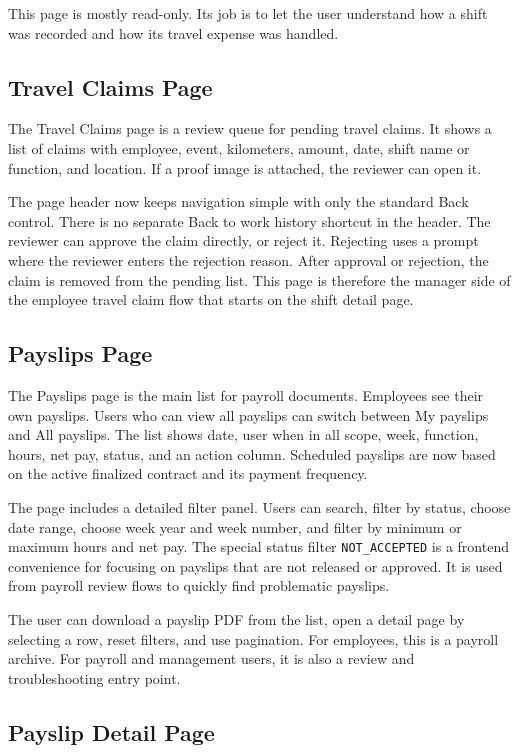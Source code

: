 \documentclass[11pt]{article}
\newcommand{\code}[1]{\nolinkurl{#1}}
\begin{document}
This page is mostly read-only. Its job is to let the user understand how a shift was recorded and how its travel expense was handled.

\subsection{Travel Claims Page}

The Travel Claims page is a review queue for pending travel claims. It shows a list of claims with employee, event, kilometers, amount, date, shift name or function, and location. If a proof image is attached, the reviewer can open it.

The page header now keeps navigation simple with only the standard Back control. There is no separate Back to work history shortcut in the header. The reviewer can approve the claim directly, or reject it. Rejecting uses a prompt where the reviewer enters the rejection reason. After approval or rejection, the claim is removed from the pending list. This page is therefore the manager side of the employee travel claim flow that starts on the shift detail page.

\subsection{Payslips Page}

The Payslips page is the main list for payroll documents. Employees see their own payslips. Users who can view all payslips can switch between My payslips and All payslips. The list shows date, user when in all scope, week, function, hours, net pay, status, and an action column. Scheduled payslips are now based on the active finalized contract and its payment frequency.

The page includes a detailed filter panel. Users can search, filter by status, choose date range, choose week year and week number, and filter by minimum or maximum hours and net pay. The special status filter \code{NOT_ACCEPTED} is a frontend convenience for focusing on payslips that are not released or approved. It is used from payroll review flows to quickly find problematic payslips.

The user can download a payslip PDF from the list, open a detail page by selecting a row, reset filters, and use pagination. For employees, this is a payroll archive. For payroll and management users, it is also a review and troubleshooting entry point.

\subsection{Payslip Detail Page}
\end{document}
